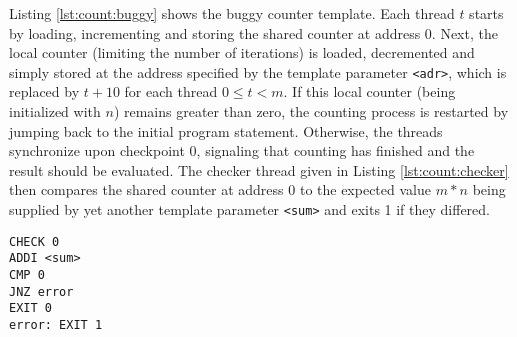 Listing \ref{lst:count:buggy} shows the buggy counter template. %
Each thread $t$ starts by loading, incrementing and storing the shared counter at address 0.
Next, the local counter (limiting the number of iterations) is loaded, decremented and simply stored at the address specified by the template parameter \texttt{<adr>}, which is replaced by $t + 10$ for each thread $0 \leq t < m$.
If this local counter (being initialized with $n$) remains greater than zero, the counting process is restarted by jumping back to the initial program statement.
Otherwise, the threads synchronize upon checkpoint 0, signaling that counting has finished and the result should be evaluated.
The checker thread given in Listing \ref{lst:count:checker} then compares the shared counter at address 0 to the expected value $m * n$ being supplied by yet another template parameter \texttt{<sum>} and exits 1 if they differed.
\begin{lstlisting}[style=asm, caption={Checker template.}, label={lst:count:checker}, mathescape, xleftmargin=0.39\textwidth]
CHECK 0
ADDI <sum>
CMP 0
JNZ error
EXIT 0
error: EXIT 1
\end{lstlisting}


